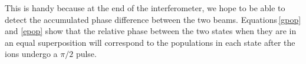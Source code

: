 This is handy because at the end of the interferometer, we hope to be able to detect the accumulated phase difference between the two beams. Equations\,\ref{gpop} and \ref{epop} show that the relative phase between the two states when they are in an equal superposition will correspond to the populations in each state after the ions undergo a $\pi/2$ pulse.
%
